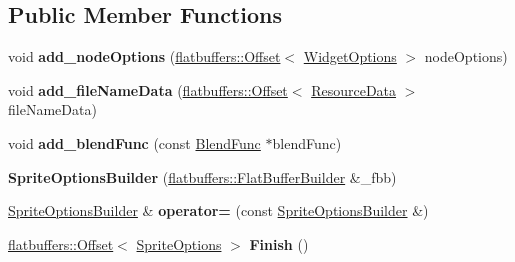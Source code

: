 \subsection*{Public Member Functions}
\begin{DoxyCompactItemize}
\item 
\mbox{\label{structflatbuffers_1_1SpriteOptionsBuilder_a5bb16c3208419f55a49abf3c481e92dc}} 
void {\bfseries add\+\_\+node\+Options} (\hyperlink{structflatbuffers_1_1Offset}{flatbuffers\+::\+Offset}$<$ \hyperlink{structflatbuffers_1_1WidgetOptions}{Widget\+Options} $>$ node\+Options)
\item 
\mbox{\label{structflatbuffers_1_1SpriteOptionsBuilder_af457b10577a19e3badc71d8790dfbe08}} 
void {\bfseries add\+\_\+file\+Name\+Data} (\hyperlink{structflatbuffers_1_1Offset}{flatbuffers\+::\+Offset}$<$ \hyperlink{structflatbuffers_1_1ResourceData}{Resource\+Data} $>$ file\+Name\+Data)
\item 
\mbox{\label{structflatbuffers_1_1SpriteOptionsBuilder_af34c0fb4d6ad93d65080aff4015a3e5a}} 
void {\bfseries add\+\_\+blend\+Func} (const \hyperlink{structBlendFunc}{Blend\+Func} $\ast$blend\+Func)
\item 
\mbox{\label{structflatbuffers_1_1SpriteOptionsBuilder_a1f632d83e623aacad0696698aed4db78}} 
{\bfseries Sprite\+Options\+Builder} (\hyperlink{classflatbuffers_1_1FlatBufferBuilder}{flatbuffers\+::\+Flat\+Buffer\+Builder} \&\+\_\+fbb)
\item 
\mbox{\label{structflatbuffers_1_1SpriteOptionsBuilder_aa7f8fb3dda0999a17f806c733369eae8}} 
\hyperlink{structflatbuffers_1_1SpriteOptionsBuilder}{Sprite\+Options\+Builder} \& {\bfseries operator=} (const \hyperlink{structflatbuffers_1_1SpriteOptionsBuilder}{Sprite\+Options\+Builder} \&)
\item 
\mbox{\label{structflatbuffers_1_1SpriteOptionsBuilder_ae1a2bc2dbcdfa013f72059a443d2d912}} 
\hyperlink{structflatbuffers_1_1Offset}{flatbuffers\+::\+Offset}$<$ \hyperlink{structflatbuffers_1_1SpriteOptions}{Sprite\+Options} $>$ {\bfseries Finish} ()

\end{DoxyCompactItemize}
